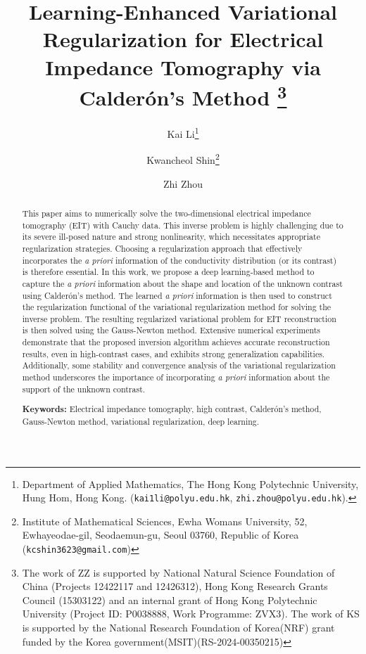 \documentclass[11pt]{article}
\newcommand{\Calderon}{Calder\'{o}n}
\begin{document}
\renewcommand{\theequation}{\arabic{section}.\arabic{equation}}
\title{{Learning-Enhanced Variational Regularization for Electrical Impedance Tomography via \Calderon's Method}%
\thanks{The work of ZZ is supported by National Natural Science Foundation of China (Projects 12422117 and 12426312), Hong Kong Research Grants Council (15303122) and an internal grant of Hong Kong Polytechnic University (Project ID: P0038888, Work Programme: ZVX3). The work of KS is supported by the National Research Foundation of Korea(NRF) grant funded by the Korea government(MSIT)(RS-2024-00350215) }}
\date{}

\author{Kai Li\thanks{Department of Applied Mathematics, The Hong Kong Polytechnic University, Hung Hom, Hong Kong. (\texttt{kai1li@polyu.edu.hk}, \texttt{zhi.zhou@polyu.edu.hk}).}\and Kwancheol Shin\thanks{Institute of Mathematical Sciences, Ewha Womans University, 52, Ewhayeodae-gil, Seodaemun-gu, Seoul
03760, Republic of Korea (\texttt{kcshin3623@gmail.com})} \and Zhi Zhou\footnotemark[2]}

\maketitle

\begin{abstract}
This paper aims to numerically solve the two-dimensional electrical impedance tomography (EIT) with Cauchy data.
This inverse problem is highly challenging due to its severe ill-posed nature and strong nonlinearity, which necessitates appropriate regularization strategies. 
Choosing a regularization approach that effectively incorporates the \textit{a priori} information of the conductivity distribution (or its contrast) is therefore essential. 
In this work, we propose a deep learning-based method to capture the \textit{a priori} information about the shape and location of the unknown contrast using \Calderon's method. 
The learned \textit{a priori} information is then used to construct the regularization functional of the variational regularization method for solving the inverse problem. The resulting regularized variational problem for EIT reconstruction is then solved using the Gauss-Newton method. Extensive numerical experiments demonstrate that the proposed inversion algorithm achieves accurate reconstruction results, even in high-contrast cases, and exhibits strong generalization capabilities. Additionally, some stability and convergence analysis of the variational regularization method underscores the importance of incorporating \textit{a priori} information about the support of the unknown contrast.  

\vspace{.2in}

{\bf Keywords:} Electrical impedance tomography, high contrast, \Calderon's method, Gauss-Newton method, variational regularization, deep learning.
\end{abstract}
\end{document}
